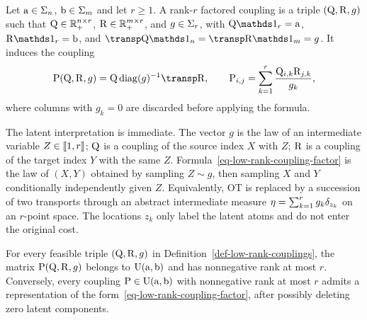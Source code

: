 \begin{defn}\label{def-low-rank-couplings}
	Let $\mathrm{a}\in\Sigma_n$, $\mathrm{b}\in\Sigma_m$ and let $r\geq1$. A rank-$r$ factored coupling is a triple $(\mathrm{Q},\mathrm{R},g)$ such that
	$\mathrm{Q}\in\mathbb{R}_+^{n\times r}$, $\mathrm{R}\in\mathbb{R}_+^{m\times r}$, and $g\in\Sigma_r$,
	with
	$\Q\ones_r=\a$, $\R\ones_r=\b$, and $\transp \Q\ones_n=\transp \R\ones_m=g$.
	It induces the coupling
	\begin{equation}\label{eq-low-rank-coupling-factor}
		\P(\Q,\R,g)
		=
		\Q\diag(g)^{-1}\transp \R,
		\qquad
		\P_{i,j}=\sum_{k=1}^r \frac{\Q_{i,k}\R_{j,k}}{g_k},
	\end{equation}
	where columns with $g_k=0$ are discarded before applying the formula.
\end{defn}

The latent interpretation is immediate. The vector $g$ is the law of an intermediate variable $Z\in\llbracket1,r\rrbracket$; $\mathrm{Q}$ is a coupling of the source index $X$ with $Z$; $\mathrm{R}$ is a coupling of the target index $Y$ with the same $Z$. Formula~\eqref{eq-low-rank-coupling-factor} is the law of $(X,Y)$ obtained by sampling $Z\sim g$, then sampling $X$ and $Y$ conditionally independently given $Z$. Equivalently, OT is replaced by a succession of two transports through an abstract intermediate measure $\eta=\sum_{k=1}^r g_k\delta_{z_k}$ on an $r$-point space. The locations $z_k$ only label the latent atoms and do not enter the original cost.

\begin{prop}\label{prop-low-rank-factorization}
	For every feasible triple $(\mathrm{Q},\mathrm{R},g)$ in Definition~\ref{def-low-rank-couplings}, the matrix $\mathrm{P}(\mathrm{Q},\mathrm{R},g)$ belongs to $\mathrm{U}(\mathrm{a},\mathrm{b})$ and has nonnegative rank at most $r$. Conversely, every coupling $\mathrm{P}\in\mathrm{U}(\mathrm{a},\mathrm{b})$ with nonnegative rank at most $r$ admits a representation of the form~\eqref{eq-low-rank-coupling-factor}, after possibly deleting zero latent components.
\end{prop}

